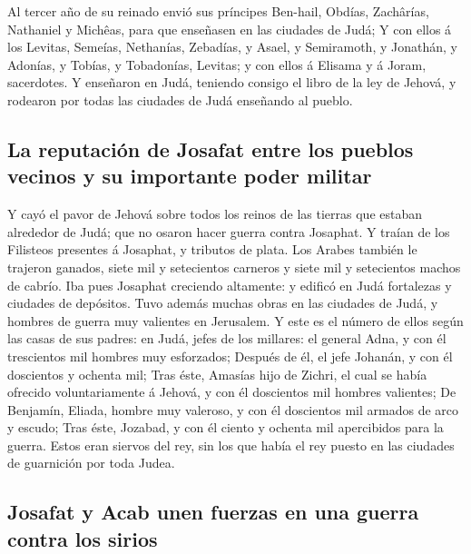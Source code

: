  Al tercer año de su reinado envió sus príncipes Ben-hail,
Obdías, Zachârías, Nathaniel y Michêas, para que enseñasen en las
ciudades de Judá;  Y con ellos á los Levitas, Semeías,
Nethanías, Zebadías, y Asael, y Semiramoth, y Jonathán, y Adonías, y
Tobías, y Tobadonías, Levitas; y con ellos á Elisama y á Joram,
sacerdotes.  Y enseñaron en Judá, teniendo consigo el
libro de la ley de Jehová, y rodearon por todas las ciudades de Judá
enseñando al pueblo.

\hypertarget{la-reputaciuxf3n-de-josafat-entre-los-pueblos-vecinos-y-su-importante-poder-militar}{%
\subsection{La reputación de Josafat entre los pueblos vecinos y su
importante poder
militar}\label{la-reputaciuxf3n-de-josafat-entre-los-pueblos-vecinos-y-su-importante-poder-militar}}

 Y cayó el pavor de Jehová sobre todos los reinos de las
tierras que estaban alrededor de Judá; que no osaron hacer guerra contra
Josaphat.  Y traían de los Filisteos presentes á
Josaphat, y tributos de plata. Los Arabes también le trajeron ganados,
siete mil y setecientos carneros y siete mil y setecientos machos de
cabrío.  Iba pues Josaphat creciendo altamente: y edificó
en Judá fortalezas y ciudades de depósitos.  Tuvo además
muchas obras en las ciudades de Judá, y hombres de guerra muy valientes
en Jerusalem.  Y este es el número de ellos según las
casas de sus padres: en Judá, jefes de los millares: el general Adna, y
con él trescientos mil hombres muy esforzados;  Después
de él, el jefe Johanán, y con él doscientos y ochenta mil;
 Tras éste, Amasías hijo de Zichri, el cual se había
ofrecido voluntariamente á Jehová, y con él doscientos mil hombres
valientes;  De Benjamín, Eliada, hombre muy valeroso, y
con él doscientos mil armados de arco y escudo;  Tras
éste, Jozabad, y con él ciento y ochenta mil apercibidos para la guerra.
 Estos eran siervos del rey, sin los que había el rey
puesto en las ciudades de guarnición por toda Judea.

\hypertarget{josafat-y-acab-unen-fuerzas-en-una-guerra-contra-los-sirios}{%
\subsection{Josafat y Acab unen fuerzas en una guerra contra los
sirios}\label{josafat-y-acab-unen-fuerzas-en-una-guerra-contra-los-sirios}}

